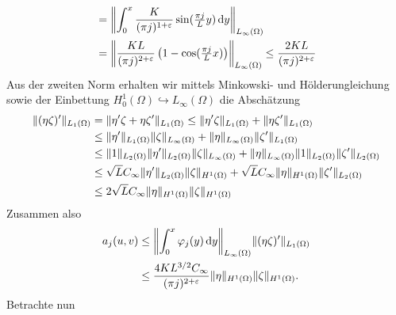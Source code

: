 \begin{Satz}
\begin{Beweis}
\begin{equation}
\begin{aligned}
                &= \norm*{\int_{0}^{x} \frac{K}{(\pi j)^{1 + \epsilon}} \sin(\tfrac{\pi j}{L} y) \diff y}_{L_{\infty}(\Omega)}
                \\&= \norm*{\frac{K L}{(\pi j)^{2 + \epsilon}} \left( 1 - \cos(\tfrac{\pi j}{L} x) \right) }_{L_{\infty}(\Omega)}
                \leq \frac{2 K L}{(\pi j)^{2 + \epsilon}}
            \end{aligned}
        \end{equation}
        Aus der zweiten Norm erhalten wir mittels Minkowski- und Hölderungleichung sowie der Einbettung $H^{1}_{0}(\Omega) \hookrightarrow L_{\infty}(\Omega)$ die Abschätzung
        \begin{equation}
            \begin{aligned}
                \norm{(\eta \zeta)'}_{L_{1}(\Omega)}
                &= \norm{\eta' \zeta + \eta \zeta'}_{L_{1}(\Omega)}
                \leq \norm{\eta' \zeta}_{L_{1}(\Omega)} + \norm{\eta \zeta'}_{L_{1}(\Omega)}
                \\&\leq \norm{\eta'}_{L_{1}(\Omega)} \norm{\zeta}_{L_{\infty}(\Omega)} + \norm{\eta}_{L_{\infty}(\Omega)} \norm{\zeta'}_{L_{1}(\Omega)}
                \\&\leq \norm{1}_{L_{2}(\Omega)} \norm{\eta'}_{L_{2}(\Omega)} \norm{\zeta}_{L_{\infty}(\Omega)} + \norm{\eta}_{L_{\infty}(\Omega)} \norm{1}_{L_{2}(\Omega)} \norm{\zeta'}_{L_{2}(\Omega)}
                \\&\leq \sqrt{L} C_{\infty} \norm{\eta'}_{L_{2}(\Omega)} \norm{\zeta}_{H^{1}(\Omega)} + \sqrt{L} C_{\infty} \norm{\eta}_{H^{1}(\Omega)} \norm{\zeta'}_{L_{2}(\Omega)}
                \\&\leq 2 \sqrt{L} C_{\infty} \norm{\eta}_{H^{1}(\Omega)} \norm{\zeta}_{H^{1}(\Omega)}
            \end{aligned}
        \end{equation}
        Zusammen also
        \begin{align}
            a_{j}(u, v)
            &\leq \norm*{\int_{0}^{x} \varphi_{j}(y) \diff y }_{L_{\infty}(\Omega)} \norm{(\eta \zeta)'}_{L_{1}(\Omega)}
            \\&\leq \frac{4 K L^{3 / 2} C_{\infty}}{(\pi j)^{2 + \epsilon}} \norm{\eta}_{H^{1}(\Omega)} \norm{\zeta}_{H^{1}(\Omega)}.
        \end{align}
        Betrachte nun

\end{Beweis}
\end{Satz}
